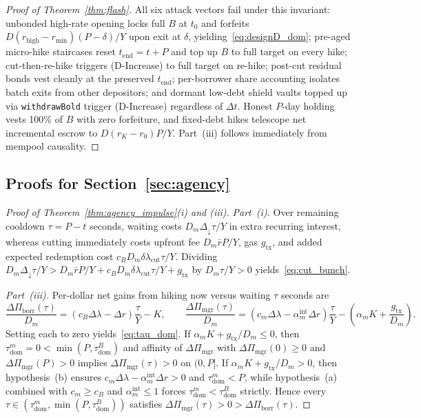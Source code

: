 \begin{proof}[Proof of Theorem~\ref{thm:flash}]
All six attack vectors fail under this invariant: unbonded high-rate opening locks full $B$ at $t_0$ and forfeits $D(r_{\mathrm{high}} - r_{\min})(P - \delta)/Y$ upon exit at $\delta$, yielding~\eqref{eq:designD_dom}; pre-aged micro-hike staircases reset $t_{\mathrm{end}} = t + P$ and top up $B$ to full target on every hike; cut-then-re-hike triggers \textup{(D-Increase)} to full target on re-hike; post-cut residual bonds vest cleanly at the preserved $t_{\mathrm{end}}$; per-borrower share accounting isolates batch exits from other depositors; and dormant low-debt shield vaults topped up via \texttt{withdrawBold} trigger \textup{(D-Increase)} regardless of $\Delta t$. Honest $P$-day holding vests 100\% of $B$ with zero forfeiture, and fixed-debt hikes telescope net incremental escrow to $D(r_K - r_0)P/Y$. Part~(iii) follows immediately from mempool causality.
\end{proof}

\subsection{Proofs for Section~\ref{sec:agency}}\label{app:proofs_agency}

\begin{proof}[Proof of Theorem~\ref{thm:agency_impulse}(i) and (iii)]
\emph{Part~(i).} Over remaining cooldown $\tau = P - t$ seconds, waiting costs $D_m \Delta_\downarrow \tau/Y$ in extra recurring interest, whereas cutting immediately costs upfront fee $D_m \bar{r}P/Y$, gas $g_{\mathrm{tx}}$, and added expected redemption cost $c_B D_m \delta\lambda_{\mathrm{cut}}\tau/Y$. Dividing $D_m \Delta_\downarrow \tau/Y > D_m \bar{r}P/Y + c_B D_m \delta\lambda_{\mathrm{cut}}\tau/Y + g_{\mathrm{tx}}$ by $D_m \tau/Y > 0$ yields~\eqref{eq:cut_bunch}.

\emph{Part~(iii).} Per-dollar net gains from hiking now versus waiting $\tau$ seconds are
\[
\frac{\Delta\Pi_{\mathrm{borr}}(\tau)}{D_m} = (c_B \Delta\lambda - \Delta r)\frac{\tau}{Y} - K, \qquad \frac{\Delta\Pi_{\mathrm{mgr}}(\tau)}{D_m} = (c_m \Delta\lambda - \alpha_m^{\mathrm{int}}\Delta r)\frac{\tau}{Y} - \left(\alpha_m K + \frac{g_{\mathrm{tx}}}{D_m}\right).
\]
Setting each to zero yields~\eqref{eq:tau_dom}. If $\alpha_m K + g_{\mathrm{tx}}/D_m \le 0$, then $\tau_{\mathrm{dom}}^m = 0 < \min(P, \tau_{\mathrm{dom}}^B)$ and affinity of $\Delta\Pi_{\mathrm{mgr}}$ with $\Delta\Pi_{\mathrm{mgr}}(0) \ge 0$ and $\Delta\Pi_{\mathrm{mgr}}(P) > 0$ implies $\Delta\Pi_{\mathrm{mgr}}(\tau) > 0$ on $(0, P]$. If $\alpha_m K + g_{\mathrm{tx}}/D_m > 0$, then hypothesis~(b) ensures $c_m \Delta\lambda - \alpha_m^{\mathrm{int}}\Delta r > 0$ and $\tau_{\mathrm{dom}}^m < P$, while hypothesis~(a) combined with $c_m \ge c_B$ and $\alpha_m^{\mathrm{int}} \le 1$ forces $\tau_{\mathrm{dom}}^m < \tau_{\mathrm{dom}}^B$ strictly. Hence every $\tau \in (\tau_{\mathrm{dom}}^m, \min(P, \tau_{\mathrm{dom}}^B))$ satisfies $\Delta\Pi_{\mathrm{mgr}}(\tau) > 0 > \Delta\Pi_{\mathrm{borr}}(\tau)$.
\end{proof}

